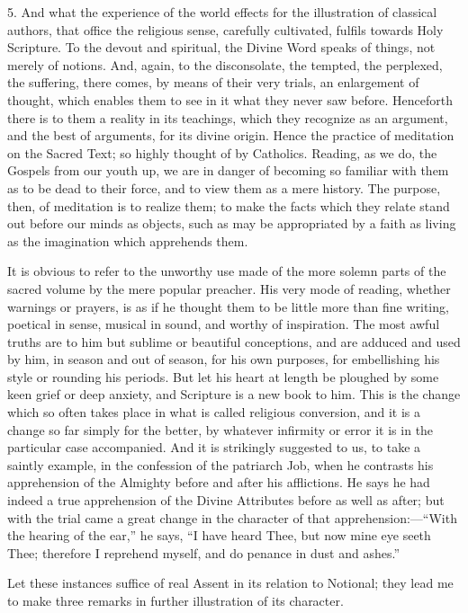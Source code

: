 5. And what the experience of the world effects for the
illustration of classical authors, that office the religious sense,
carefully cultivated, fulfils towards Holy Scripture. To the devout
and spiritual, the Divine Word speaks of things, not merely of
notions. And, again, to the disconsolate, the tempted, the perplexed,
the suffering, there comes, by means of their very trials, an
enlargement of thought, which enables them to see in it what they
never saw before. Henceforth there is to them a reality in its
teachings, which they recognize as an argument, and the best of
arguments, for its divine origin. Hence the practice of meditation on
the Sacred Text; so highly thought of by Catholics. Reading, as we do,
the Gospels from our youth up, we are in danger of becoming so
familiar with them as to be dead to their force, and to view them as a
mere history. The purpose, then, of meditation is to realize them; to
make the facts which they relate stand out before our minds as
objects, such as may be appropriated by a faith as living as the
imagination which apprehends them.

It is obvious to refer to the unworthy use made of the more solemn
parts of the sacred volume by the mere popular preacher. His very mode
of reading, whether warnings or prayers, is as if he thought them to
be little more than fine writing, poetical in sense, musical in sound,
and worthy of inspiration. The most awful truths are to him but
sublime or beautiful conceptions, and are adduced and used by him, in
season and out of season, for his own purposes, for embellishing
his style or rounding his periods. But let his heart at length be
ploughed by some keen grief or deep anxiety, and Scripture is a new
book to him. This is the change which so often takes place in what is
called religious conversion, and it is a change so far simply for the
better, by whatever infirmity or error it is in the particular case
accompanied. And it is strikingly suggested to us, to take a saintly
example, in the confession of the patriarch Job, when he contrasts his
apprehension of the Almighty before and after his afflictions. He says
he had indeed a true apprehension of the Divine Attributes before as
well as after; but with the trial came a great change in the character
of that apprehension:—``With the hearing of the ear,'' he
says, ``I have heard Thee, but now mine eye seeth Thee; therefore
I reprehend myself, and do penance in dust and ashes.''

Let these instances suffice of real Assent in its relation to
Notional; they lead me to make three remarks in further illustration
of its character.

